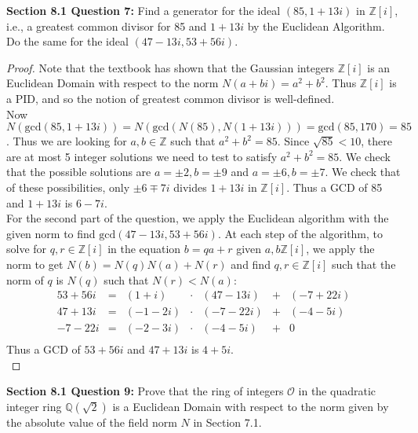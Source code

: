 \documentclass{article}
\begin{document}
\textbf{Section 8.1 Question 7:} Find a generator for the ideal
  $(85,1+13i)$ in $\mathbb{Z}[i]$, i.e., a greatest common divisor for 85
  and $1+13i$ by the Euclidean Algorithm. Do the same for the ideal
  $(47-13i,53+56i)$.

  \begin{proof}
    Note that the textbook has shown that the Gaussian integers
    $\mathbb{Z}[i]$ is an Euclidean Domain with respect to the norm
    $N(a+bi)=a^2+b^2$. Thus $\mathbb{Z}[i]$ is a PID, and so the notion of
    greatest common divisor is well-defined. \\

    Now $N(\text{gcd}(85,1+13i)) =N(\text{gcd}(N(85),N(1+13i)))
    =\text{gcd}(85,170)=85$. Thus we are looking for $a,b\in\mathbb{Z}$
    such that $a^2+b^2=85$. Since $\sqrt{85}<10$, there are at most 5
    integer solutions we need to test to satisfy $a^2+b^2=85$. We check
    that the possible solutions are $a=\pm2,b=\pm9$ and $a=\pm6,b=\pm7$. We
    check that of these possibilities, only $\pm6\mp7i$ divides $1+13i$ in
    $\mathbb{Z}[i]$. Thus a GCD of 85 and $1+13i$ is $6-7i$. \\

    For the second part of the question, we apply the Euclidean algorithm
    with the given norm to find $\text{gcd}(47-13i,53+56i)$. At each step
    of the algorithm, to solve for $q,r\in\mathbb{Z}[i]$ in the equation
    $b=qa+r$ given $a,b\mathbb{Z}[i]$, we apply the norm to get
    $N(b)=N(q)N(a)+N(r)$ and find $q,r\in\mathbb{Z}[i]$ such that the norm
    of $q$ is $N(q)$ such that $N(r)<N(a)$:
    \[\begin{array}{rcrcrcr}
      53+56i &= &(1+i)   &\cdot &(47-13i) &+ &(-7+22i) \\
      47+13i &= &(-1-2i) &\cdot &(-7-22i) &+ &(-4-5i) \\
      -7-22i &= &(-2-3i) &\cdot &(-4-5i)  &+ &0 \\
    \end{array}\]
    Thus a GCD of $53+56i$ and $47+13i$ is $4+5i$. \\
  \end{proof}

\textbf{Section 8.1 Question 9:} Prove that the ring of integers
  $\mathcal{O}$ in the quadratic integer ring $\mathbb{Q}(\sqrt{2})$ is a
  Euclidean Domain with respect to the norm given by the absolute value of
  the field norm $N$ in Section 7.1.
\end{document}
